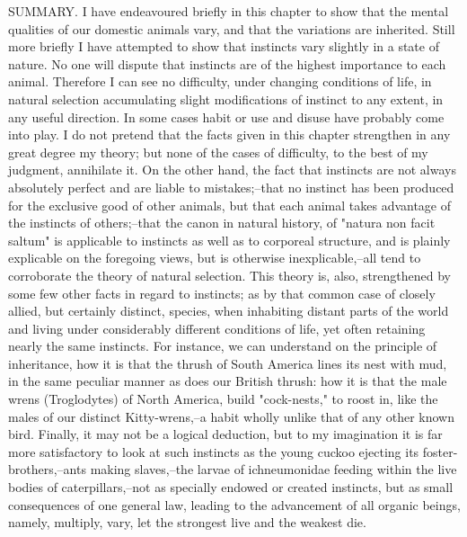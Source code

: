 SUMMARY.
I have endeavoured briefly in this chapter to show that the mental qualities of our domestic animals vary, and that the variations are inherited. Still more briefly I have attempted to show that instincts vary slightly in a state of nature. No one will dispute that instincts are of the highest importance to each animal. Therefore I can see no difficulty, under changing conditions of life, in natural selection accumulating slight modifications of instinct to any extent, in any useful direction. In some cases habit or use and disuse have probably come into play. I do not pretend that the facts given in this chapter strengthen in any great degree my theory; but none of the cases of difficulty, to the best of my judgment, annihilate it. On the other hand, the fact that instincts are not always absolutely perfect and are liable to mistakes;--that no instinct has been produced for the exclusive good of other animals, but that each animal takes advantage of the instincts of others;--that the canon in natural history, of "natura non facit saltum" is applicable to instincts as well as to corporeal structure, and is plainly explicable on the foregoing views, but is otherwise inexplicable,--all tend to corroborate the theory of natural selection.
This theory is, also, strengthened by some few other facts in regard to instincts; as by that common case of closely allied, but certainly distinct, species, when inhabiting distant parts of the world and living under considerably different conditions of life, yet often retaining nearly the same instincts. For instance, we can understand on the principle of inheritance, how it is that the thrush of South America lines its nest with mud, in the same peculiar manner as does our British thrush: how it is that the male wrens (Troglodytes) of North America, build "cock-nests," to roost in, like the males of our distinct Kitty-wrens,--a habit wholly unlike that of any other known bird. Finally, it may not be a logical deduction, but to my imagination it is far more satisfactory to look at such instincts as the young cuckoo ejecting its foster-brothers,--ants making slaves,--the larvae of ichneumonidae feeding within the live bodies of caterpillars,--not as specially endowed or created instincts, but as small consequences of one general law, leading to the advancement of all organic beings, namely, multiply, vary, let the strongest live and the weakest die. 